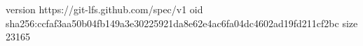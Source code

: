 version https://git-lfs.github.com/spec/v1
oid sha256:ccfaf3aa50b04fb149a3e30225921da8e62e4ac6fa04dc4602ad19fd211cf2bc
size 23165
